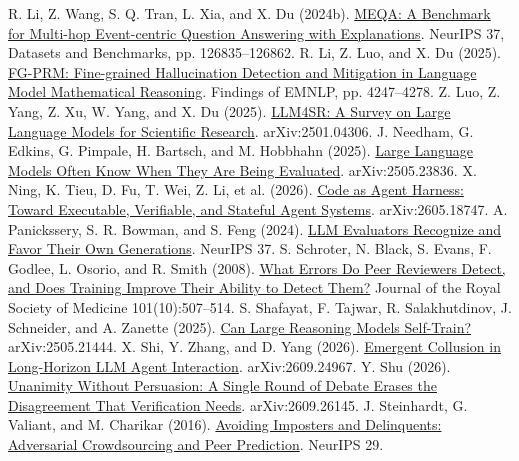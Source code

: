 \documentclass[12pt,letterpaper]{article}
\begin{document}
\begin{thebibliography}{}
 R. Li, Z. Wang, S. Q. Tran, L. Xia, and X. Du (2024b). \href{https://proceedings.neurips.cc/paper_files/paper/2024/hash/e560a0b22e4432003d0dba63ff8dc457-Abstract.html}{MEQA: A Benchmark for Multi-hop Event-centric Question Answering with Explanations}. NeurIPS 37, Datasets and Benchmarks, pp. 126835--126862.
 R. Li, Z. Luo, and X. Du (2025). \href{https://aclanthology.org/2025.findings-emnlp.228/}{FG-PRM: Fine-grained Hallucination Detection and Mitigation in Language Model Mathematical Reasoning}. Findings of EMNLP, pp. 4247--4278.
 Z. Luo, Z. Yang, Z. Xu, W. Yang, and X. Du (2025). \href{https://arxiv.org/abs/2501.04306}{LLM4SR: A Survey on Large Language Models for Scientific Research}. arXiv:2501.04306.
 J. Needham, G. Edkins, G. Pimpale, H. Bartsch, and M. Hobbhahn (2025). \href{https://arxiv.org/abs/2505.23836}{Large Language Models Often Know When They Are Being Evaluated}. arXiv:2505.23836.
 X. Ning, K. Tieu, D. Fu, T. Wei, Z. Li, et al. (2026). \href{https://arxiv.org/abs/2605.18747}{Code as Agent Harness: Toward Executable, Verifiable, and Stateful Agent Systems}. arXiv:2605.18747.
 A. Panickssery, S. R. Bowman, and S. Feng (2024). \href{https://arxiv.org/abs/2404.13076}{LLM Evaluators Recognize and Favor Their Own Generations}. NeurIPS 37.
 S. Schroter, N. Black, S. Evans, F. Godlee, L. Osorio, and R. Smith (2008). \href{https://doi.org/10.1258/jrsm.2008.080062}{What Errors Do Peer Reviewers Detect, and Does Training Improve Their Ability to Detect Them?} Journal of the Royal Society of Medicine 101(10):507--514.
 S. Shafayat, F. Tajwar, R. Salakhutdinov, J. Schneider, and A. Zanette (2025). \href{https://arxiv.org/abs/2505.21444}{Can Large Reasoning Models Self-Train?} arXiv:2505.21444.
 X. Shi, Y. Zhang, and D. Yang (2026). \href{https://arxiv.org/abs/2609.24967}{Emergent Collusion in Long-Horizon LLM Agent Interaction}. arXiv:2609.24967.
 Y. Shu (2026). \href{https://arxiv.org/abs/2609.26145}{Unanimity Without Persuasion: A Single Round of Debate Erases the Disagreement That Verification Needs}. arXiv:2609.26145.
 J. Steinhardt, G. Valiant, and M. Charikar (2016). \href{https://arxiv.org/abs/1606.05374}{Avoiding Imposters and Delinquents: Adversarial Crowdsourcing and Peer Prediction}. NeurIPS 29.

\end{thebibliography}
\end{document}

